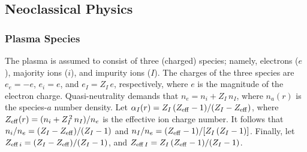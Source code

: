 \documentclass[12pt,prb,aps]{revtex4-1}
\begin{document}
\subsection{Neoclassical Physics}\label{appb}
\subsubsection{Plasma Species}\label{a3}
The plasma is assumed to consist of three (charged) species; namely,  electrons ($e$), majority ions ($i$), and impurity ions
($I$).  The charges of the  three species are $e_e=-e$, $e_i= e$, and $e_I=Z_I\,e$, respectively, where
$e$ is the magnitude of the electron charge. 
Quasi-neutrality demands that
$n_e= n_i+ Z_I\,n_I$, where $n_a(r)$ is the species-$a$ number density. 
 Let 
$\alpha_I(r) =Z_I\,(Z_{\rm eff}-1)/(Z_I-Z_{\rm eff})$,
where 
$Z_{\rm eff}(r) = (n_i+Z_I^{\,2}\,n_I)/n_e$
is the effective ion charge number. It follows that
$n_i/n_e = (Z_I-Z_{\rm eff})/(Z_I-1)$
and
$n_I/n_e= (Z_{\rm eff}-1)/[Z_I\,(Z_I-1)]$. Finally, let $Z_{{\rm eff}\,i}= (Z_I-Z_{\rm eff})/(Z_I-1)$, and
$Z_{{\rm eff}\,I}=Z_I\,(Z_{\rm eff}-1)/(Z_I-1)$. 
\end{document}
